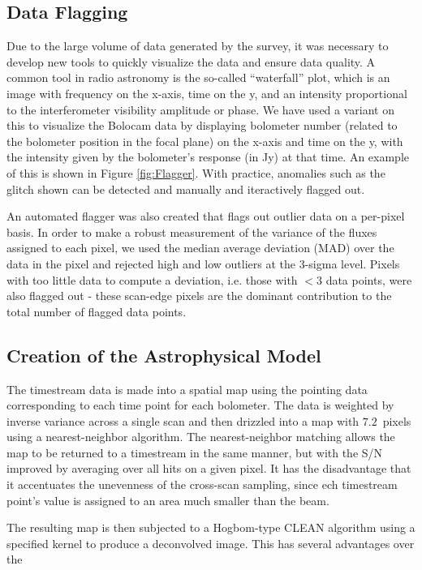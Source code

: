 \documentclass[12pt,preprint]{aastex}
\begin{document}
\subsection{Data Flagging}

Due to the large volume of data generated by the survey, it was
necessary to develop new tools to quickly visualize the data and
ensure data quality.  A common tool in radio astronomy is the
so-called ``waterfall'' plot, which is an image with frequency on the
x-axis, time on the y, and an intensity proportional to the
interferometer visibility amplitude or phase.  We have used a variant
on this to visualize the Bolocam data by displaying bolometer number
(related to the bolometer position in the focal plane) on the x-axis
and time on the y, with the intensity given by the bolometer's
response (in Jy) at that time.  An example of this is shown in Figure
\ref{fig:Flagger}.  With practice, anomalies such as the glitch shown
can be detected and manually and iteractively flagged out.

An automated flagger was also created that flags out outlier data on a
per-pixel basis.  In order to make a robust measurement of the
variance of the fluxes assigned to each pixel, we used the median
average deviation (MAD) over the data in the pixel and rejected high and low
outliers at the 3-sigma level.  Pixels with too little data to compute
a deviation, i.e. those with $<3$ data points, were also flagged out -
these scan-edge pixels are the dominant contribution to the total
number of flagged data points.

\subsection{Creation of the Astrophysical Model}

The timestream data is made into a spatial map using the pointing data
corresponding to each time point for each bolometer.  The data is
weighted by inverse variance across a single scan and then drizzled
into a map with $7.2$\arcsec\ pixels using a nearest-neighbor
algorithm.  The nearest-neighbor matching allows the map to be
returned to a timestream in the same manner, but with the S/N improved
by averaging over all hits on a given pixel.  It has the disadvantage
that it accentuates the unevenness of the cross-scan sampling, since
ech timestream point's value is assigned to an area much smaller than
the beam.

The resulting map is then subjected to a Hogbom-type CLEAN algorithm
\citep{hogbom} using a specified kernel to produce a deconvolved
image.  This has several advantages over the 
\end{document}
